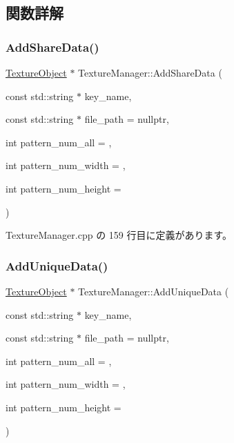 \subsection{関数詳解}
\mbox{\label{class_texture_manager_a571c5b288fe16c53965f45d8bd7c8769}} 
\subsubsection{\texorpdfstring{Add\+Share\+Data()}{AddShareData()}}
{\footnotesize\ttfamily \mbox{\hyperlink{class_texture_object}{Texture\+Object}} $\ast$ Texture\+Manager\+::\+Add\+Share\+Data (\begin{DoxyParamCaption}\item[{const std\+::string $\ast$}]{key\+\_\+name,  }\item[{const std\+::string $\ast$}]{file\+\_\+path = {\ttfamily nullptr},  }\item[{int}]{pattern\+\_\+num\+\_\+all = {},  }\item[{int}]{pattern\+\_\+num\+\_\+width = {},  }\item[{int}]{pattern\+\_\+num\+\_\+height = {} }\end{DoxyParamCaption})\hspace{0.3cm}{\ttfamily [static]}}



 Texture\+Manager.\+cpp の 159 行目に定義があります。

\mbox{\label{class_texture_manager_af86003fd2afaf09f0295745d486e42e4}} 
\subsubsection{\texorpdfstring{Add\+Unique\+Data()}{AddUniqueData()}}
{\footnotesize\ttfamily \mbox{\hyperlink{class_texture_object}{Texture\+Object}} $\ast$ Texture\+Manager\+::\+Add\+Unique\+Data (\begin{DoxyParamCaption}\item[{const std\+::string $\ast$}]{key\+\_\+name,  }\item[{const std\+::string $\ast$}]{file\+\_\+path = {\ttfamily nullptr},  }\item[{int}]{pattern\+\_\+num\+\_\+all = {},  }\item[{int}]{pattern\+\_\+num\+\_\+width = {},  }\item[{int}]{pattern\+\_\+num\+\_\+height = {} }\end{DoxyParamCaption})\hspace{0.3cm}{\ttfamily [static]}}




